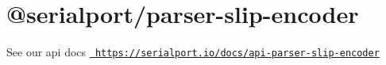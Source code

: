 \chapter{@serialport/parser-\/slip-\/encoder}
\hypertarget{md_Dashboard_2node__modules_2_0dserialport_2parser-slip-encoder_2README}{}\label{md_Dashboard_2node__modules_2_0dserialport_2parser-slip-encoder_2README}
\label{md_Dashboard_2node__modules_2_0dserialport_2parser-slip-encoder_2README_autotoc_md91}%
%
 See our api docs \href{https://serialport.io/docs/api-parser-slip-encoder}{\texttt{ https\+://serialport.\+io/docs/api-\/parser-\/slip-\/encoder}} 